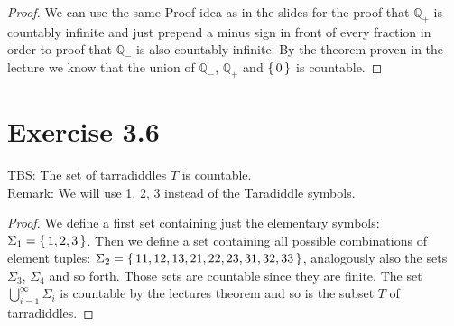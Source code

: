\documentclass{article} %
\newcommand{\homeworkNumber}{3}
\begin{document}
\begin{proof}
We can use the same Proof idea as in the slides for the proof that $\mathbb{Q}_+$ is countably infinite and just prepend a minus sign in front of every fraction in order to proof that $\mathbb{Q}_-$ is also countably infinite. By the theorem proven in the lecture we know that the union of $\mathbb{Q}_-$, $\mathbb{Q}_+$ and $\set{0}$ is countable.
\end{proof}

\newpage

\section*{Exercise \homeworkNumber.6}
TBS: The set of tarradiddles $T$ is countable.\\
Remark: We will use 1, 2, 3 instead of the Taradiddle symbols.
\begin{proof}
We define a first set containing just the elementary symbols: $\Sigma_1 = \set{1, 2, 3}$. Then we define a set containing all possible combinations of element tuples: $\Sigma_2 = \set{11, 12, 13, 21, 22, 23, 31, 32, 33}$, analogously also the sets $\Sigma_3$, $\Sigma_4$ and so forth. Those sets are countable since they are finite. The set $\bigcup_{i = 1}^\infty \Sigma_i$ is countable by the lectures theorem and so is the subset $T$ of tarradiddles.
\end{proof}
\end{document}
